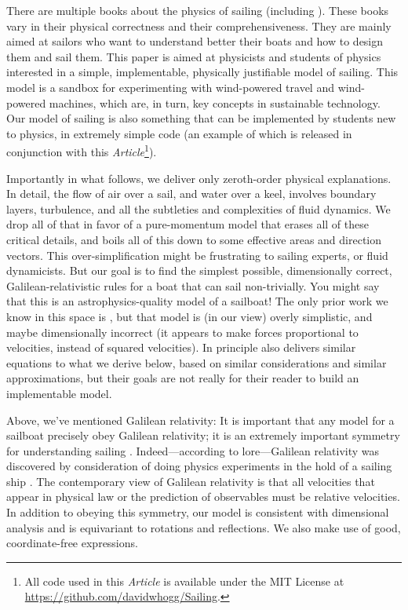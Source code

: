 \documentclass[letterpaper]{article}
\newcommand{\documentname}{\textsl{Article}}
\begin{document}
There are multiple books about the physics of sailing (including \cite{symmetry, explained, sails, pos}).
These books vary in their physical correctness and their comprehensiveness.
They are mainly aimed at sailors who want to understand better their boats and how to design them and sail them.
This paper is aimed at physicists and students of physics interested in a simple, implementable, physically justifiable model of sailing.
This model is a sandbox for experimenting with wind-powered travel and wind-powered machines, which are, in turn, key concepts in sustainable technology.
Our model of sailing is also something that can be implemented by students new to physics, in extremely simple code (an example of which is released in conjunction with this \documentname\footnote{All code used in this \documentname{} is available under the MIT License at \url{https://github.com/davidwhogg/Sailing}.}).

Importantly in what follows, we deliver only zeroth-order physical explanations.
In detail, the flow of air over a sail, and water over a keel, involves boundary layers, turbulence, and all the subtleties and complexities of fluid dynamics.
We drop all of that in favor of a pure-momentum model that erases all of these critical details, and boils all of this down to some effective areas and direction vectors.
This over-simplification might be frustrating to sailing experts, or fluid dynamicists.
But our goal is to find the simplest possible, dimensionally correct, Galilean-relativistic rules for a boat that can sail non-trivially.
You might say that this is an astrophysics-quality model of a sailboat!
The only prior work we know in this space is \cite{tao}, but that model is (in our view) overly simplistic, and maybe dimensionally incorrect (it appears to make forces proportional to velocities, instead of squared velocities).
In principle also \cite{pos} delivers similar equations to what we derive below, based on similar considerations and similar approximations, but their goals are not really for their reader to build an implementable model.

Above, we've mentioned Galilean relativity:
It is important that any model for a sailboat precisely obey Galilean relativity; it is an extremely important symmetry for understanding sailing \cite{symmetry}.
Indeed---according to lore---Galilean relativity was discovered by consideration of doing physics experiments in the hold of a sailing ship \cite{galileo}.
The contemporary view of Galilean relativity is that all velocities that appear in physical law or the prediction of observables must be relative velocities.
In addition to obeying this symmetry, our model is consistent with dimensional analysis and is equivariant to rotations and reflections.
We also make use of good, coordinate-free expressions.
\end{document}
